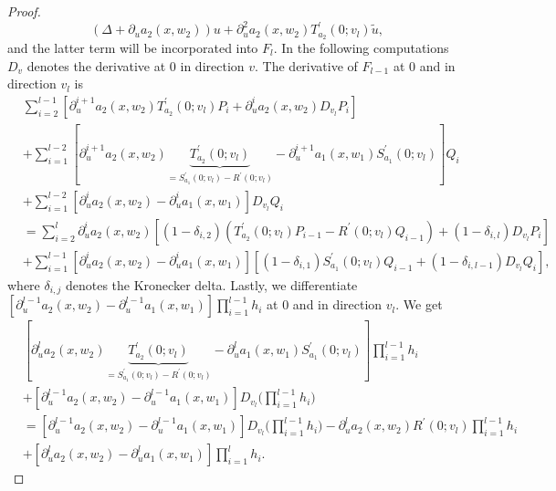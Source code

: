 \documentclass[10pt,a4paper]{amsart}
\begin{document}
\begin{proof}
\begin{equation*}
	(\Delta+\partial_{u}a_{2}(x,w_{2}))u + \partial_{u}^{2}a_{2}(x,w_{2})T_{a_{2}}^{\prime}(0;v_{l})\tilde{u},
\end{equation*}
and the latter term will be incorporated into \( F_{l} \).
In the following computations \( D_{v} \) denotes the derivative at \( 0 \) in direction \( v \).
The derivative of \( F_{l-1} \) at \( 0 \) and in direction \( v_{l} \) is
\begin{equation*}
\begin{aligned}
	&\sum_{i=2}^{l-1}[\partial_{u}^{i+1}a_{2}(x,w_{2})T_{a_{2}}^{\prime}(0;v_{l})P_{i} + \partial_{u}^{i}a_{2}(x,w_{2})D_{v_{l}}P_{i}] \\
	&+\sum_{i=1}^{l-2}[\partial_{u}^{i+1}a_{2}(x,w_{2})\underbrace{T_{a_{2}}^{\prime}(0;v_{l})}_{=S_{a_{1}}^{\prime}(0;v_{l})-R^{\prime}(0;v_{l})}-\partial_{u}^{i+1}a_{1}(x,w_{1})S_{a_{1}}^{\prime}(0;v_{l})]Q_{i} \\
	&+\sum_{i=1}^{l-2}[\partial_{u}^{i}a_{2}(x,w_{2})-\partial_{u}^{i}a_{1}(x,w_{1})]D_{v_{l}}Q_{i} \\
	&=\sum_{i=2}^{l}\partial_{u}^{i}a_{2}(x,w_{2})[(1-\delta_{i,2})(T_{a_{2}}^{\prime}(0;v_{l})P_{i-1} - R^{\prime}(0;v_{l})Q_{i-1}) + (1-\delta_{i,l})D_{v_{l}}P_{i}] \\
	&+\sum_{i=1}^{l-1}[\partial_{u}^{i}a_{2}(x,w_{2})-\partial_{u}^{i}a_{1}(x,w_{1})][(1-\delta_{i,1})S_{a_{1}}^{\prime}(0;v_{l})Q_{i-1} + (1-\delta_{i,l-1})D_{v_{l}}Q_{i}],
\end{aligned}
\end{equation*}
where \( \delta_{i,j} \) denotes the Kronecker delta.
Lastly, we differentiate \( [\partial_{u}^{l-1}a_{2}(x,w_{2})-\partial_{u}^{l-1}a_{1}(x,w_{1})]\prod_{i=1}^{l-1}h_{i} \) at 0 and in direction \( v_{l} \).
We get
\begin{equation*}
\begin{aligned}
	&[\partial_{u}^{l}a_{2}(x,w_{2})\underbrace{T_{a_{2}}^{\prime}(0;v_{l})}_{=S_{a_{1}}^{\prime}(0;v_{l})-R^{\prime}(0;v_{l})}-\partial_{u}^{l}a_{1}(x,w_{1})S_{a_{1}}^{\prime}(0;v_{l})]\prod_{i=1}^{l-1}h_{i} \\
	&+ [\partial_{u}^{l-1}a_{2}(x,w_{2})-\partial_{u}^{l-1}a_{1}(x,w_{1})]D_{v_{l}}\Big(\prod_{i=1}^{l-1}h_{i}\Big) \\
	&=[\partial_{u}^{l-1}a_{2}(x,w_{2})-\partial_{u}^{l-1}a_{1}(x,w_{1})]D_{v_{l}}\Big(\prod_{i=1}^{l-1}h_{i}\Big) -\partial_{u}^{l}a_{2}(x,w_{2})R^{\prime}(0;v_{l})\prod_{i=1}^{l-1}h_{i}\\
	& +[\partial_{u}^{l}a_{2}(x,w_{2})-\partial_{u}^{l}a_{1}(x,w_{1})]\prod_{i=1}^{l}h_{i}.

\end{aligned}
\end{equation*}
\end{proof}
\end{document}
